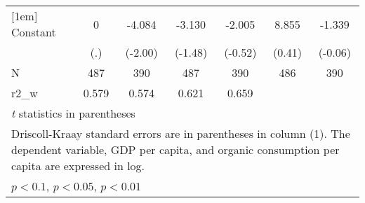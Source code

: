 \begin{table}[htbp]
\begin{tabular}{l*{6}{c}}
[1em]
Constant            &           0         &      -4.084\sym{*}  &      -3.130         &      -2.005         &       8.855         &      -1.339         \\
                    &         (.)         &     (-2.00)         &     (-1.48)         &     (-0.52)         &      (0.41)         &     (-0.06)         \\
\hline
N                   &         487         &         390         &         487         &         390         &         486         &         390         \\
r2\_w                &       0.579         &       0.574         &       0.621         &       0.659         &                     &                     \\
\hline\hline
\multicolumn{7}{l}{\footnotesize \textit{t} statistics in parentheses}\\
\multicolumn{7}{l}{\footnotesize Driscoll-Kraay standard errors are in parentheses in column (1). The dependent variable, GDP per capita, and organic consumption per capita are expressed in log.}\\
\multicolumn{7}{l}{\footnotesize \sym{*} \(p<0.1\), \sym{**} \(p<0.05\), \sym{***} \(p<0.01\)}\\
\end{tabular}
\end{table}
